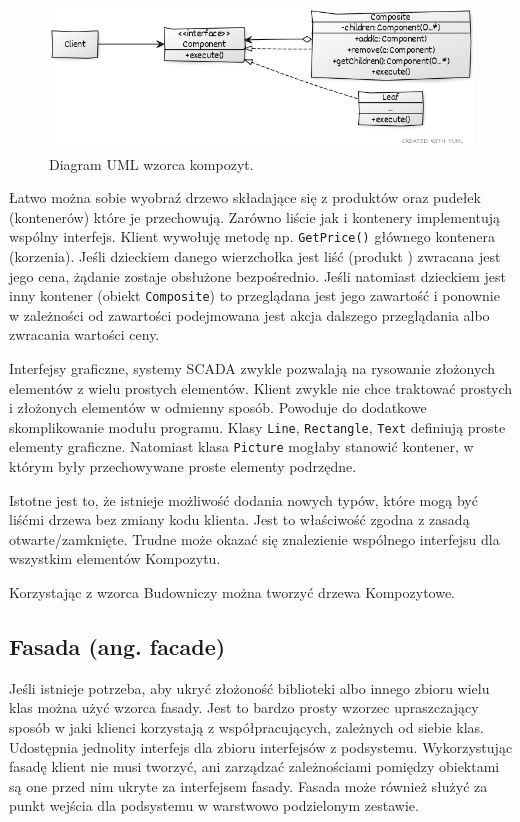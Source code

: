 \begin{figure}[hbt!]
	\centering
	\includegraphics[width=0.8\linewidth]{images/CompositeUml}
	\caption{Diagram UML wzorca kompozyt.}
	\label{lab3/fig/CompositeUml}
\end{figure}
%

Łatwo można sobie wyobraź drzewo składające się z produktów oraz pudełek (kontenerów) które je przechowują. Zarówno liście jak i kontenery implementują wspólny interfejs. Klient wywołuję metodę np. \texttt{GetPrice()} głównego kontenera (korzenia). Jeśli dzieckiem danego wierzchołka jest liść (produkt ) zwracana jest jego cena, żądanie zostaje obsłużone bezpośrednio. Jeśli natomiast dzieckiem jest inny kontener (obiekt \texttt{Composite}) to przeglądana jest jego zawartość i ponownie w zależności od zawartości podejmowana jest akcja dalszego przeglądania albo zwracania wartości ceny.

Interfejsy graficzne, systemy SCADA zwykle pozwalają na rysowanie złożonych elementów z wielu prostych elementów. Klient zwykle nie chce traktować prostych i złożonych elementów w odmienny sposób. Powoduje do dodatkowe skomplikowanie modułu programu. Klasy \texttt{Line}, \texttt{Rectangle}, \texttt{Text} definiują proste elementy graficzne. Natomiast klasa \texttt{Picture} mogłaby stanowić kontener, w którym były przechowywane proste elementy podrzędne.

Istotne jest to, że istnieje możliwość dodania nowych typów, które mogą być liśćmi drzewa bez zmiany kodu klienta. Jest to właściwość zgodna z zasadą otwarte/zamknięte. Trudne może okazać się znalezienie wspólnego interfejsu dla wszystkim elementów Kompozytu.

Korzystając z wzorca Budowniczy można tworzyć drzewa Kompozytowe.

\subsection{Fasada (ang. facade)}
Jeśli istnieje potrzeba, aby ukryć złożoność biblioteki albo innego zbioru wielu klas można użyć wzorca fasady. Jest to bardzo prosty wzorzec upraszczający sposób w jaki klienci korzystają z współpracujących, zależnych od siebie klas. Udostępnia jednolity interfejs dla zbioru interfejsów z podsystemu. Wykorzystując fasadę klient nie musi tworzyć, ani zarządzać zależnościami pomiędzy obiektami są one przed nim ukryte za interfejsem fasady. Fasada może również służyć za punkt wejścia dla podsystemu w warstwowo podzielonym zestawie.

